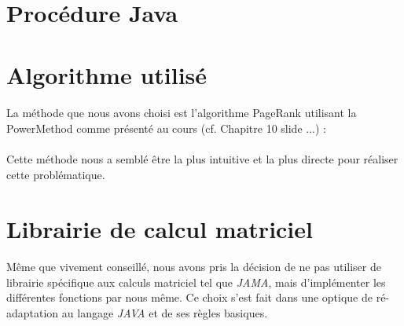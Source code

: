 \documentclass[10pt,a4paper]{article}
\begin{document}



\newpage

\section{Procédure Java}
\section{Algorithme utilisé}

\paragraph{}La méthode que nous avons choisi est l'algorithme PageRank utilisant la PowerMethod comme présenté au cours (cf. Chapitre 10 slide ...) :

\paragraph{}Cette méthode nous a semblé être la plus intuitive et la plus directe pour réaliser cette problématique.

\section{Librairie de calcul matriciel}

\paragraph{}Même que vivement conseillé, nous avons pris la décision de ne pas utiliser de librairie spécifique aux calculs matriciel tel que \textit{JAMA}, mais d'implémenter les différentes fonctions par nous même. Ce choix s'est fait dans une optique de ré-adaptation au langage \textit{JAVA} et de ses règles basiques. %
\end{document}
